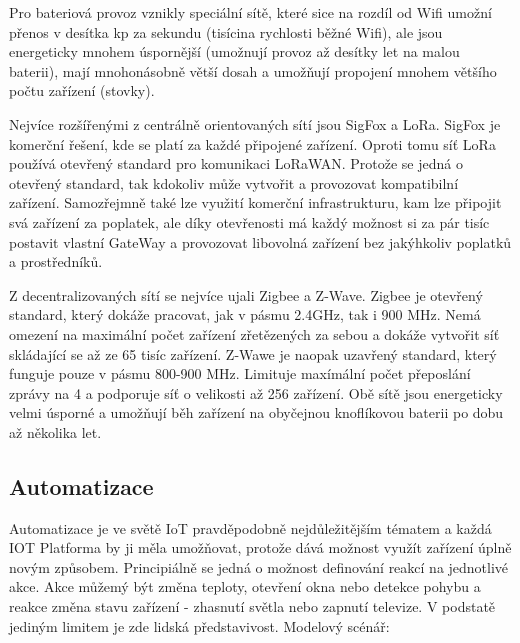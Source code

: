 \documentclass[thesis=B,czech]{FITthesis}[2019/12/23]
\begin{document}
Pro bateriová provoz vznikly speciální sítě, které sice na rozdíl od Wifi umožní přenos v desítka kp za sekundu (tisícina rychlosti běžné Wifi), ale jsou energeticky mnohem úspornější (umožnují provoz až desítky let na malou baterii), mají mnohonásobně větší dosah a umožňují propojení mnohem většího počtu zařízení (stovky).

Nejvíce rozšířenými z centrálně orientovaných sítí jsou SigFox a LoRa. SigFox je komerční řešení, kde se platí za každé připojené zařízení. Oproti tomu síť LoRa používá otevřený standard pro komunikaci LoRaWAN. Protože se jedná o otevřený standard, tak kdokoliv může vytvořit a provozovat kompatibilní zařízení. Samozřejmně také lze využití komerční infrastrukturu, kam lze připojit svá zařízení za poplatek, ale díky otevřenosti má každý možnost si za pár tisíc postavit vlastní GateWay a provozovat libovolná zařízení bez jakýhkoliv poplatků a prostředníků.

Z decentralizovaných sítí se nejvíce ujali Zigbee a Z-Wave. Zigbee je otevřený standard, který dokáže pracovat, jak v pásmu 2.4GHz, tak i 900 MHz. Nemá omezení na maximální počet zařízení zřetězených za sebou a dokáže vytvořit síť skládající se až ze 65 tisíc zařízení. Z-Wawe je naopak uzavřený standard, který funguje pouze v pásmu 800-900 MHz. Limituje maxímální počet přeposlání zprávy na 4 a podporuje síť o velikosti až 256 zařízení. Obě sítě jsou energeticky velmi úsporné a umožňují běh zařízení na obyčejnou knoflíkovou baterii po dobu až několika let.

\subsection{Automatizace}
Automatizace je ve světě IoT pravděpodobně nejdůležitějším tématem a každá IOT Platforma by ji měla umožňovat, protože dává možnost využít zařízení úplně novým způsobem. Principiálně se jedná o možnost definování reakcí na jednotlivé akce. Akce můžemý být změna teploty, otevření okna nebo detekce pohybu a reakce změna stavu zařízení - zhasnutí světla nebo zapnutí televize. V podstatě jediným limitem je zde lidská představivost. Modelový scénář:
\end{document}
